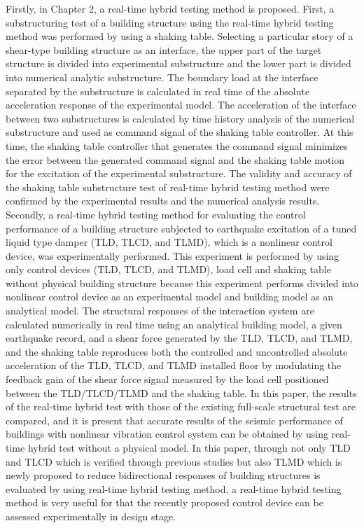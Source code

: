 Firstly, in Chapter 2, a real-time hybrid testing method is proposed. First, a substructuring test of a building structure using the real-time hybrid testing method was performed by using a shaking table. Selecting a particular story of a shear-type building structure as an interface, the upper part of the target structure is divided into experimental substructure and the lower part is divided into numerical analytic substructure. The boundary load at the interface separated by the substructure is calculated in real time of the absolute acceleration response of the experimental model. The acceleration of the interface between two substructures is calculated by time history analysis of the numerical substructure and used as command signal of the shaking table controller. At this time, the shaking table controller that generates the command signal minimizes the error between the generated command signal and the shaking table motion for the excitation of the experimental substructure. The validity and accuracy of the shaking table substructure test of real-time hybrid testing method were confirmed by the experimental results and the numerical analysis results. Secondly, a real-time hybrid testing method for evaluating the control performance of a building structure subjected to earthquake excitation of a tuned liquid type damper (TLD, TLCD, and TLMD), which is a nonlinear control device, was experimentally performed. This experiment is performed by using only control devices (TLD, TLCD, and TLMD), load cell and shaking table without physical building structure because this experiment performs divided into nonlinear control device as an experimental model and building model as an analytical model. The structural responses of the interaction system are calculated numerically in real time using an analytical building model, a given earthquake record, and a shear force generated by the TLD, TLCD, and TLMD, and the shaking table reproduces both the controlled and uncontrolled absolute acceleration of the TLD, TLCD, and TLMD installed floor by modulating the feedback gain of the shear force signal measured by the load cell positioned between the TLD/TLCD/TLMD and the shaking table. In this paper, the results of the real-time hybrid test with those of the existing full-scale structural test are compared, and it is present that accurate results of the seismic performance of buildings with nonlinear vibration control system can be obtained by using real-time hybrid test without a physical model. In this paper, through not only TLD and TLCD which is verified through previous studies but also TLMD which is newly proposed to reduce bidirectional responses of building structures is evaluated by using real-time hybrid testing method, a real-time hybrid testing method is very useful for that the recently proposed control device can be assessed experimentally in design stage.

